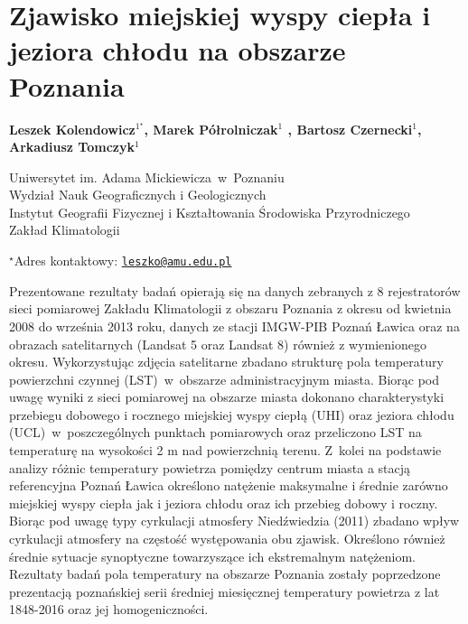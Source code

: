 \documentclass[\main/boa.tex]{subfiles}
\begin{document}
\section{Zjawisko miejskiej wyspy ciepła i jeziora chłodu na obszarze Poznania}

\begin{center}
  {\bf {} Leszek Kolendowicz$^{1^\star}$,  Marek Półrolniczak$^{1}$ ,  Bartosz Czernecki$^{1}$,   Arkadiusz Tomczyk$^{1}$}
\end{center}

\vskip 0.3cm

\begin{affiliations}
\begin{enumerate}
\begin{minipage}{0.915\textwidth}
\centering
\item Uniwersytet im. Adama Mickiewicza~w~Poznaniu \\ Wydział Nauk Geograficznych i Geologicznych  \\ Instytut Geografii Fizycznej i Kształtowania Środowiska Przyrodniczego\\
Zakład Klimatologii \\[-2pt]
\end{minipage}
\end{enumerate}
$^\star$Adres kontaktowy: \href{mailto:leszko@amu.edu.pl}{\nolinkurl{leszko@amu.edu.pl}}\\
\end{affiliations}

\vskip 0.5cm


\vskip 0.5cm

Prezentowane rezultaty badań opierają się na danych zebranych z 8 rejestratorów sieci pomiarowej Zakładu Klimatologii z obszaru Poznania z okresu od kwietnia 2008 do września 2013 roku, danych ze stacji IMGW-PIB Poznań Ławica oraz na obrazach satelitarnych (Landsat 5 oraz Landsat 8) również z wymienionego okresu. Wykorzystując zdjęcia satelitarne zbadano strukturę pola temperatury powierzchni czynnej (LST)~w~obszarze administracyjnym miasta. Biorąc pod uwagę wyniki z sieci pomiarowej na obszarze miasta dokonano charakterystyki przebiegu dobowego i rocznego miejskiej wyspy ciepłą (UHI) oraz jeziora chłodu (UCL)~w~poszczególnych punktach pomiarowych oraz przeliczono LST na temperaturę na wysokości 2 m nad powierzchnią terenu. Z~kolei na podstawie analizy różnic temperatury powietrza pomiędzy centrum miasta a stacją referencyjna Poznań Ławica określono natężenie maksymalne i średnie zarówno miejskiej wyspy ciepła jak i jeziora chłodu oraz ich przebieg dobowy i roczny. Biorąc pod uwagę typy cyrkulacji atmosfery Niedźwiedzia (2011) zbadano wpływ cyrkulacji atmosfery na częstość występowania obu zjawisk. Określono również średnie sytuacje synoptyczne towarzyszące ich ekstremalnym natężeniom. Rezultaty badań pola temperatury na obszarze Poznania zostały poprzedzone prezentacją poznańskiej serii średniej miesięcznej temperatury powietrza z lat 1848-2016 oraz jej homogeniczności. 
\end{document}
